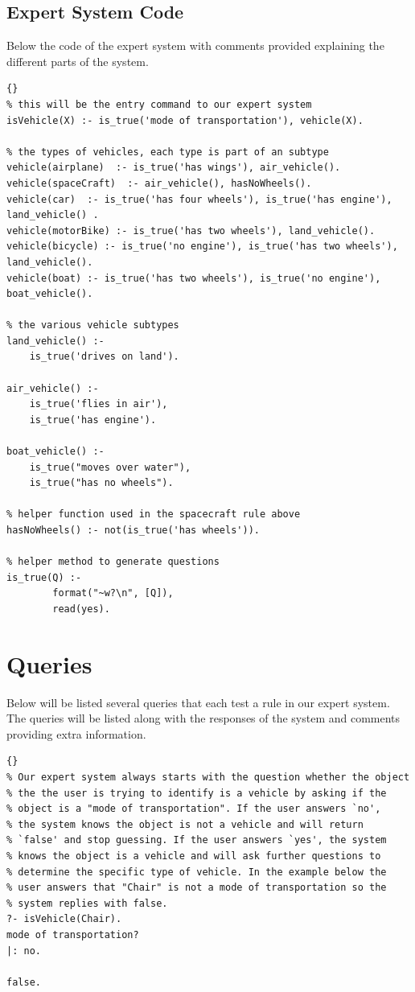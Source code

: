 \subsection{Expert System Code} \label{man-logic-expert-system}
Below the code of the expert system with comments provided explaining
the different parts of the system.
\begin{lstlisting}{}
% this will be the entry command to our expert system
isVehicle(X) :- is_true('mode of transportation'), vehicle(X).

% the types of vehicles, each type is part of an subtype
vehicle(airplane)  :- is_true('has wings'), air_vehicle().
vehicle(spaceCraft)  :- air_vehicle(), hasNoWheels().
vehicle(car)  :- is_true('has four wheels'), is_true('has engine'), land_vehicle() .
vehicle(motorBike) :- is_true('has two wheels'), land_vehicle().
vehicle(bicycle) :- is_true('no engine'), is_true('has two wheels'), land_vehicle().
vehicle(boat) :- is_true('has two wheels'), is_true('no engine'), boat_vehicle().

% the various vehicle subtypes
land_vehicle() :-
	is_true('drives on land').

air_vehicle() :-
	is_true('flies in air'),
	is_true('has engine').

boat_vehicle() :-
	is_true("moves over water"),
    is_true("has no wheels").

% helper function used in the spacecraft rule above
hasNoWheels() :- not(is_true('has wheels')).

% helper method to generate questions
is_true(Q) :-
        format("~w?\n", [Q]),
        read(yes).
\end{lstlisting}

\newpage
\section{Queries} \label{man-queries}
Below will be listed several queries that each test a rule in our expert system.
The queries will be listed along with the responses of the system and comments
providing extra information.

\begin{lstlisting}{}
% Our expert system always starts with the question whether the object
% the the user is trying to identify is a vehicle by asking if the
% object is a "mode of transportation". If the user answers `no',
% the system knows the object is not a vehicle and will return
% `false' and stop guessing. If the user answers `yes', the system
% knows the object is a vehicle and will ask further questions to
% determine the specific type of vehicle. In the example below the
% user answers that "Chair" is not a mode of transportation so the
% system replies with false.
?- isVehicle(Chair).
mode of transportation?
|: no.

false.
\end{lstlisting}

